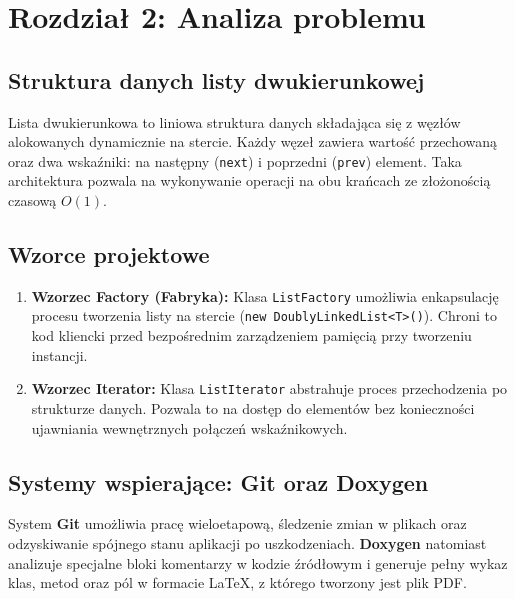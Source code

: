 \section{Rozdział 2: Analiza problemu}

\subsection{Struktura danych listy dwukierunkowej}
Lista dwukierunkowa to liniowa struktura danych składająca się z węzłów alokowanych dynamicznie na stercie. Każdy węzeł zawiera wartość przechowaną oraz dwa wskaźniki: na następny (\texttt{next}) i poprzedni (\texttt{prev}) element. Taka architektura pozwala na wykonywanie operacji na obu krańcach ze złożonością czasową $O(1)$.

\subsection{Wzorce projektowe}
\begin{enumerate}
    \item \textbf{Wzorzec Factory (Fabryka):} Klasa \texttt{ListFactory} umożliwia enkapsulację procesu tworzenia listy na stercie (\texttt{new DoublyLinkedList<T>()}). Chroni to kod kliencki przed bezpośrednim zarządzeniem pamięcią przy tworzeniu instancji.
    \item \textbf{Wzorzec Iterator:} Klasa \texttt{ListIterator} abstrahuje proces przechodzenia po strukturze danych. Pozwala to na dostęp do elementów bez konieczności ujawniania wewnętrznych połączeń wskaźnikowych.
\end{enumerate}

\subsection{Systemy wspierające: Git oraz Doxygen}
System \textbf{Git} umożliwia pracę wieloetapową, śledzenie zmian w plikach oraz odzyskiwanie spójnego stanu aplikacji po uszkodzeniach. \textbf{Doxygen} natomiast analizuje specjalne bloki komentarzy w kodzie źródłowym i generuje pełny wykaz klas, metod oraz pól w formacie \LaTeX{}, z którego tworzony jest plik PDF.
